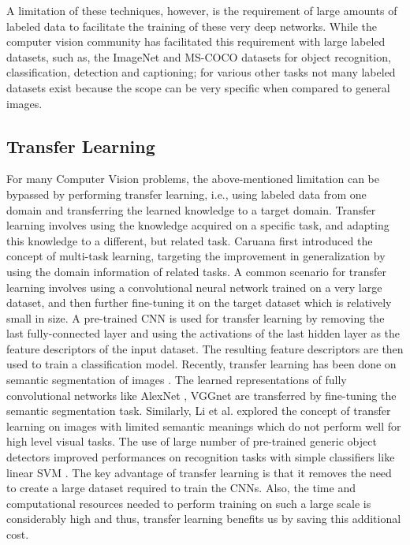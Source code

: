 \par

A limitation of these techniques, however, is the requirement of large amounts of labeled data to facilitate the training of these very deep networks. While the computer vision community has facilitated this requirement with large labeled datasets, such as, the ImageNet \cite{ILSVRC15} and MS-COCO \cite{lin2014microsoft} datasets for object recognition, classification, detection and captioning; for various other tasks not many labeled datasets exist because the scope can be very specific when compared to general images.

\subsection{Transfer Learning}
For many Computer Vision problems, the above-mentioned limitation can be bypassed by performing transfer learning, i.e., using labeled data from one domain and transferring the learned knowledge to a target domain. Transfer learning involves using the knowledge acquired on a specific task, and adapting this knowledge to a different, but related task. Caruana \cite{caruana1998multitask} first introduced the concept of multi-task learning, targeting the improvement in generalization by using the domain information of related tasks. A common scenario for transfer learning involves using a convolutional neural network trained on a very large dataset, and then further fine-tuning it on the target dataset which is relatively small in size. A pre-trained CNN is used for transfer learning by removing the last fully-connected layer and using the activations of the last hidden layer as the feature descriptors of the input dataset. The resulting feature descriptors are then used to train a classification model. Recently, transfer learning has been done on semantic segmentation of images  \cite{long2015fully}. The learned representations of fully convolutional networks like AlexNet \cite{krizhevsky2012imagenet}, VGGnet \cite{vgg} are transferred by fine-tuning the semantic segmentation task. Similarly, Li et al. explored the concept of transfer learning on images with limited semantic meanings which do not perform well for high level visual tasks. The use of large number of pre-trained generic object detectors improved performances on recognition tasks with simple classifiers like linear SVM \cite{li2010object}. The key advantage of transfer learning is that it removes the need to create a large dataset required to train the CNNs. Also, the time and computational resources needed to perform training on such a large scale is considerably high and thus, transfer learning benefits us by saving this additional cost.

